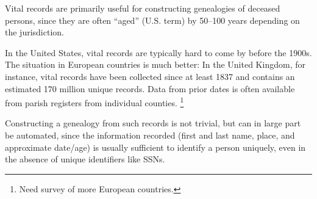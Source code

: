 \documentclass{article}
\begin{document}
Vital records are primarily useful for constructing genealogies of deceased persons, since they are often ``aged'' (U.S. term) by 50--100 years depending on the jurisdiction.

In the United States, vital records are typically hard to come by before the 1900s. The situation in European countries is much better: In the United Kingdom, for instance, vital records have been collected since at least 1837 \cite{ukbmd.org.uk} and contains an estimated 170 million unique records. Data from prior dates is often available from parish registers from individual counties. \footnote{Need survey of more European countries.} 


Constructing a genealogy from such records is not trivial, but can in large part be automated, since the information recorded (first and last name, place, and approximate date/age) is usually sufficient to identify a person uniquely, even in the absence of unique identifiers like SSNs. 
\end{document}
